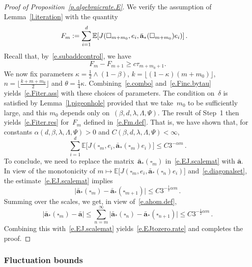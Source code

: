 \documentclass[11pt]{article} %
\let\oldsquare\square %
\renewcommand{\square}{\oldsquare}
\numberwithin{equation}{section}
\theoremstyle{definition}
\let\originalleft\left
\let\originalright\right
\renewcommand{\left}{\mathopen{}\mathclose\bgroup\originalleft}
\renewcommand{\right}{\aftergroup\egroup\originalright}
\renewcommand{\a}{\mathbf{a}}
\newcommand{\ahom}{\bar{\a}}
\newcommand{\cu}{\square}
\newcommand{\E}{\mathbb{E}}
\begin{document}
\begin{proof}[{Proof of Proposition~\ref{p.algebraicrate.E}}]
We verify the assumption of Lemma~\ref{l.iteration} with the quantity
\begin{align}
\label{e.Fm.def}
F_m
& 
:= 
\sum_{i=1}^d \E \left[ J(\cu_{m+m_0},e_i,\ahom_*(\cu_{m+m_0})e_i) \right]
\,.
\end{align}
Recall that, by~\eqref{e.subaddcontrol}, we have
\begin{equation}
\label{e.Finc.bytau}
F_m - F_{m+1}
\geq 
c
\tau_{m+ m_0 + 1}
.
\end{equation}
We now fix parameters $\kappa = \frac12 \wedge (1-\beta)$, $k = \lfloor (1-\kappa) (m+m_0) \rfloor$, $n = \lfloor \frac{k + m + m_0}{2} \rfloor$  and  $\theta = \frac14 \kappa$. 
Combining~\eqref{e.combo} and~\eqref{e.Finc.bytau} yields~\eqref{e.Fiter.ass} with these choices of parameters. The condition on~$\delta$ is satisfied by Lemma~\ref{l.pigeonhole} provided that we take~$m_0$ to be sufficiently large, and this $m_0$ depends only on~$(\beta,d,\lambda,\Lambda,\Psi)$. The result of Step~1 then yields~\eqref{e.Fiter.res} for~$F_m$ defined in~\eqref{e.Fm.def}.
That is, we have shown that, for constants $\alpha(d,\beta,\lambda,\Lambda,\Psi)>0$ and $C(\beta,d,\lambda,\Lambda,\Psi)<\infty$,
\begin{equation}
\label{e.EJ.scalemat}
\sum_{i=1}^d \E \bigl[ J(\cu_{m},e_i,\ahom_*(\cu_{m})e_i) \bigr]
\leq
C 3^{-\alpha m} \,.
\end{equation}
To conclude, we need to replace the matrix~$\ahom_*(\cu_{m})$ in~\eqref{e.EJ.scalemat} with $\ahom$. 
In view of the monotonicity of $m\mapsto \E \bigl[ J(\cu_{m},e_i,\ahom_*(\cu_{n})e_i) \bigr]$ and~\eqref{e.diagonalset}, 
the estimate~\eqref{e.EJ.scalemat} implies
\begin{equation*}
\bigl| \ahom_*(\cu_{m}) - \ahom_*(\cu_{m+1}) \bigr|
\leq 
C 3^{-\frac12 \alpha m} \,.
\end{equation*}
Summing over the scales, we get, in view of~\eqref{e.ahom.def},
\begin{equation*}
\bigl| \ahom_*(\cu_{m}) - \ahom \bigr|
\leq 
\sum_{n=m}^\infty 
\bigl| \ahom_*(\cu_{n}) - \ahom_*(\cu_{n+1}) \bigr|
\leq
C 3^{-\frac12 \alpha m} \,.
\end{equation*}
Combining this with~\eqref{e.EJ.scalemat} yields~\eqref{e.EJtozero.rate} and completes the proof. 
\end{proof}



\subsubsection{Fluctuation bounds}
\end{document}
